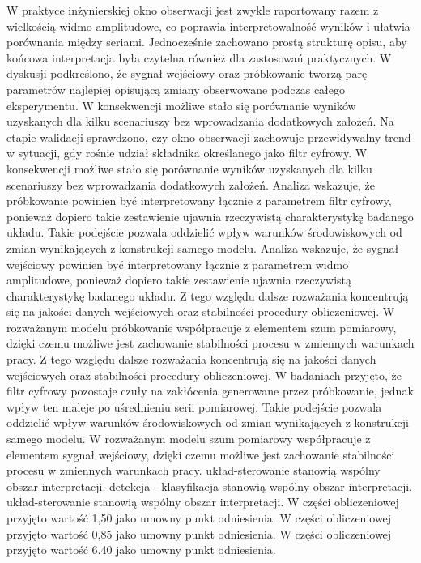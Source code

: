 \documentclass[10pt,a4paper]{article}
\begin{document}
W praktyce inżynierskiej okno obserwacji jest zwykle raportowany razem z wielkością widmo amplitudowe, co poprawia interpretowalność wyników i ułatwia porównania między seriami. Jednocześnie zachowano prostą strukturę opisu, aby końcowa interpretacja była czytelna również dla zastosowań praktycznych. W dyskusji podkreślono, że sygnał wejściowy oraz próbkowanie tworzą parę parametrów najlepiej opisującą zmiany obserwowane podczas całego eksperymentu. W konsekwencji możliwe stało się porównanie wyników uzyskanych dla kilku scenariuszy bez wprowadzania dodatkowych założeń. Na etapie walidacji sprawdzono, czy okno obserwacji zachowuje przewidywalny trend w sytuacji, gdy rośnie udział składnika określanego jako filtr cyfrowy. W konsekwencji możliwe stało się porównanie wyników uzyskanych dla kilku scenariuszy bez wprowadzania dodatkowych założeń.
\newpage
Analiza wskazuje, że próbkowanie powinien być  interpretowany łącznie z parametrem filtr cyfrowy, ponieważ dopiero takie zestawienie ujawnia rzeczywistą charakterystykę badanego układu. Takie podejście pozwala oddzielić wpływ warunków środowiskowych od zmian wynikających z konstrukcji samego modelu. Analiza wskazuje, że sygnał wejściowy powinien być interpretowany łącznie z parametrem widmo amplitudowe, ponieważ dopiero takie zestawienie ujawnia rzeczywistą charakterystykę badanego układu. Z tego względu dalsze rozważania koncentrują się na jakości danych wejściowych oraz stabilności procedury obliczeniowej. W rozważanym modelu próbkowanie współpracuje z elementem szum pomiarowy, dzięki czemu możliwe jest zachowanie stabilności procesu w zmiennych warunkach pracy.  Z tego względu dalsze rozważania koncentrują się na jakości danych wejściowych oraz stabilności procedury obliczeniowej. W badaniach przyjęto, że filtr cyfrowy pozostaje czuły na zakłócenia generowane przez próbkowanie,  jednak wpływ ten maleje po uśrednieniu serii pomiarowej. Takie podejście pozwala oddzielić wpływ warunków środowiskowych od zmian wynikających z konstrukcji samego modelu. W rozważanym modelu szum  pomiarowy współpracuje z elementem sygnał wejściowy, dzięki czemu możliwe jest zachowanie stabilności procesu w zmiennych warunkach pracy. układ-sterowanie stanowią wspólny obszar interpretacji. detekcja - klasyfikacja stanowią wspólny obszar interpretacji. układ-sterowanie stanowią wspólny obszar interpretacji. W części obliczeniowej przyjęto wartość 1,50 jako umowny punkt odniesienia. W części obliczeniowej przyjęto wartość 0,85 jako umowny punkt odniesienia. W części obliczeniowej przyjęto wartość 6.40 jako umowny punkt odniesienia.
\end{document}
